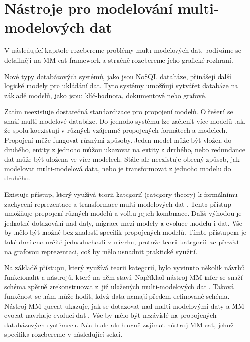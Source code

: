 \pagestyle{plain}  %

\chapter{Nástroje pro modelování multi-modelových dat}

V následující kapitole rozebereme problémy multi-modelových dat, podíváme se detailněji na MM-cat framework a stručně rozebereme jeho grafické rozhraní.

Nové typy databázových systémů, jako jsou NoSQL databáze, přinášejí další logické modely pro ukládání dat. Tyto systémy umožňují vytvářet databáze na základě modelů, jako jsou: klíč-hodnota, dokumentové nebo grafové.

Zatím neexistuje dostatečná standardizace pro propojení modelů. O řešení se snaží multi-modelové databáze. Do jednoho systému lze začlenit více modelů tak, že spolu koexistují v různých vzájemně propojených formátech a modelech. Propojení může fungovat různými způsoby. Jeden model může být vložen do druhého, entity z jednoho můžou ukazovat na entity z druhého, nebo redundance dat může být uložena ve více modelech. Stále ale neexistuje obecný způsob, jak modelovat multi-modelová data, nebo je transformovat z jednoho modelu do druhého.

Existuje přístup, který využívá teorii kategorií (category theory) k formálnímu zachycení reprezentace a transformace multi-modelových dat \cite{cat_theory}. Tento přístup umožňuje propojení různých modelů a volbu jejich kombinace. Další výhodou je jednotné dotazování nad daty, migrace mezi modely a evoluce modelu i dat. Vše by mělo být možné bez znalosti specifik propojených modelů. Tímto přístupem je také docíleno určité jednoduchosti v návrhu, protože teorii kategorií lze převést na grafovou reprezentaci, což by mělo usnadnit praktické využití.

Na základě přístupu, který využívá teorii kategorií, bylo vyvinuto několik návrhů funkcionalit a nástrojů, které na něm staví. Například nástroj MM-infer se snaží schéma zpětně zrekonstruovat z~již uložených multi-modelových dat \cite{MM_infer}. Taková funkčnost se nám může hodit, když data nemají předem definované schéma. Nástroj MM-quecat ukazuje, jak se dotazovat nad multi-modelovými daty \cite{MM_quecat} a MM-evocat navrhuje evoluci dat \cite{MM_evocat}. Vše by mělo být nezávislé na propojených databázových systémech. Nás bude ale hlavně zajímat nástroj MM-cat, jehož specifika rozebereme v následující sekci.


